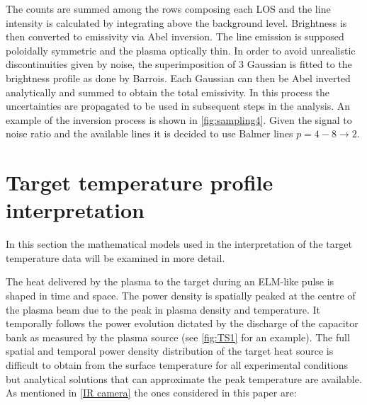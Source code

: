 The counts are summed among the rows composing each LOS and the line intensity is calculated by integrating above the background level. Brightness is then converted to emissivity via Abel inversion. The line emission is supposed poloidally symmetric and the plasma optically thin. In order to avoid unrealistic discontinuities given by noise, the superimposition of 3 Gaussian is fitted to the brightness profile as done by Barrois.\cite{Science2017} Each Gaussian can then be Abel inverted analytically and summed to obtain the total emissivity. In this process the uncertainties are propagated to be used in subsequent steps in the analysis. An example of the inversion process is shown in \autoref{fig:sampling4}. Given the signal to noise ratio and the available lines it is decided to use Balmer lines $p=4-8 \rightarrow 2$.

\section{Target temperature profile interpretation}\label{Target temperature profile interpretation}
In this section the mathematical models used in the interpretation of the target temperature data will be examined in more detail.

The heat delivered by the plasma to the target during an ELM-like pulse is shaped in time and space. The power density is spatially peaked at the centre of the plasma beam due to the peak in plasma density and temperature. It temporally follows the power evolution dictated by the discharge of the capacitor bank as measured by the plasma source (see \autoref{fig:TS1} for an example). The full spatial and temporal power density distribution of the target heat source is difficult to obtain from the surface temperature for all experimental conditions but analytical solutions that can approximate the peak temperature are available. As mentioned in \autoref{IR camera} the ones considered in this paper are:

